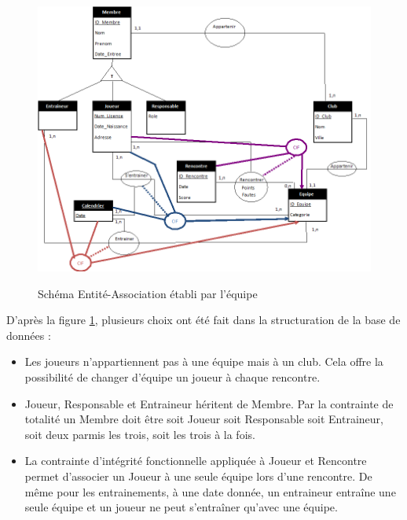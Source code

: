 \documentclass[a4paper»,8pt,french,fleqn]{report}
\begin{document}
\begin{figure}[h]
  \centering
    \includegraphics[scale=0.7]{Schema_EA.png}
    \label{fig:schema_ea}
    \caption{Schéma Entité-Association établi par l'équipe}
\end{figure}

D'après la figure \ref{fig:schema_ea}, plusieurs choix ont été fait dans la structuration de la base de données : \\

\begin{itemize}

\item Les joueurs n'appartiennent pas à une équipe mais à un club. Cela offre la possibilité de changer d'équipe un joueur à chaque rencontre. \\

\item Joueur, Responsable et Entraineur héritent de Membre. Par la contrainte de totalité un Membre doit être soit Joueur soit Responsable soit Entraineur, soit deux parmis les trois, soit les trois à la fois.\\

\item La contrainte d'intégrité fonctionnelle appliquée à Joueur et Rencontre permet d'associer un Joueur à une seule équipe lors d'une rencontre. De même pour les entrainements, à une date donnée, un entraineur entraîne une seule équipe et un joueur ne peut s'entraîner qu'avec une équipe.

\end{itemize}
\end{document}
